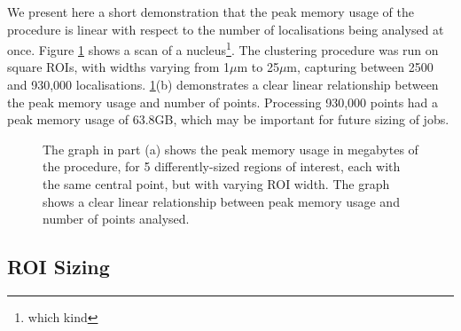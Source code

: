 \documentclass[11pt]{article}
\begin{document}
We present here a short demonstration that the peak memory usage of the procedure is linear with respect to the number of localisations being analysed at once. Figure \ref{memusage} shows a scan of a nucleus\footnote{which kind}. The clustering procedure was run on square ROIs, with widths varying from 1$\mu$m to 25$\mu$m, capturing between 2500 and 930,000 localisations. \ref{memusage}(b) demonstrates a clear linear relationship between the peak memory usage and number of points. Processing 930,000 points had a peak memory usage of 63.8GB, which may be important for future sizing of jobs.

\begin{figure}[t!]
	\centering
	\qquad
	\caption{The graph in part (a) shows the peak memory usage in megabytes of the procedure, for 5 differently-sized regions of interest, each with the same central point, but with varying ROI width. The graph shows a clear linear relationship between peak memory usage and number of points analysed.}%
	\label{memusage}
\end{figure}

\subsection{ROI Sizing}
\end{document}
